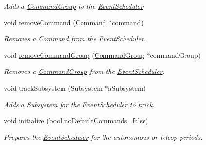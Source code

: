 \begin{DoxyCompactItemize}
\begin{DoxyCompactList}\small\item\em Adds a \mbox{\hyperlink{classlib_iterative_robot_1_1_command_group}{Command\+Group}} to the \mbox{\hyperlink{classlib_iterative_robot_1_1_event_scheduler}{Event\+Scheduler}}. \end{DoxyCompactList}\item 
void \mbox{\hyperlink{classlib_iterative_robot_1_1_event_scheduler_a038be4eb06e564fe47d326b458a8985c}{remove\+Command}} (\mbox{\hyperlink{classlib_iterative_robot_1_1_command}{Command}} $\ast$command)
\begin{DoxyCompactList}\small\item\em Removes a \mbox{\hyperlink{classlib_iterative_robot_1_1_command}{Command}} from the \mbox{\hyperlink{classlib_iterative_robot_1_1_event_scheduler}{Event\+Scheduler}}. \end{DoxyCompactList}\item 
void \mbox{\hyperlink{classlib_iterative_robot_1_1_event_scheduler_a6c1501cbee6a630b2b63881aa200fdf4}{remove\+Command\+Group}} (\mbox{\hyperlink{classlib_iterative_robot_1_1_command_group}{Command\+Group}} $\ast$command\+Group)
\begin{DoxyCompactList}\small\item\em Removes a \mbox{\hyperlink{classlib_iterative_robot_1_1_command_group}{Command\+Group}} from the \mbox{\hyperlink{classlib_iterative_robot_1_1_event_scheduler}{Event\+Scheduler}}. \end{DoxyCompactList}\item 
void \mbox{\hyperlink{classlib_iterative_robot_1_1_event_scheduler_a1130cfd602dec9e4091571b47b60f378}{track\+Subsystem}} (\mbox{\hyperlink{classlib_iterative_robot_1_1_subsystem}{Subsystem}} $\ast$a\+Subsystem)
\begin{DoxyCompactList}\small\item\em Adds a \mbox{\hyperlink{classlib_iterative_robot_1_1_subsystem}{Subsystem}} for the \mbox{\hyperlink{classlib_iterative_robot_1_1_event_scheduler}{Event\+Scheduler}} to track. \end{DoxyCompactList}\item 
void \mbox{\hyperlink{classlib_iterative_robot_1_1_event_scheduler_ad67e946fc54ad0a755a36ed5b87279b4}{initialize}} (bool no\+Default\+Commands=false)
\begin{DoxyCompactList}\small\item\em Prepares the \mbox{\hyperlink{classlib_iterative_robot_1_1_event_scheduler}{Event\+Scheduler}} for the autonomous or teleop periods. \end{DoxyCompactList}\end{DoxyCompactItemize}
